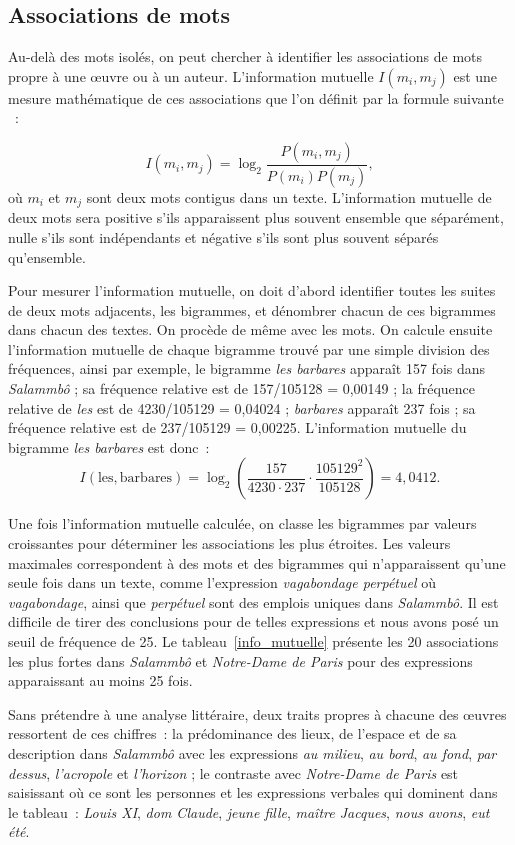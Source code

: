 \documentclass[]{article}
\begin{document}
\subsection{Associations de mots}
Au-delà des mots isolés, on peut chercher à identifier les associations de mots propre à une œuvre ou à un auteur. L'information mutuelle $I(m_i ,m_j )$ est une mesure mathématique de ces associations que l'on définit par la formule suivante \citep{Fano1961}~:

\[
I(m_i ,m_j ) = \log_2 \frac{P(m_i ,m_j )}{P(m_i )P(m_j )},
\]
où $m_i$ et $m_j$ sont deux mots contigus dans un texte. L'information mutuelle de deux mots sera positive s'ils apparaissent plus souvent ensemble que séparément, nulle s'ils sont indépendants et négative s'ils sont plus souvent séparés qu'ensemble.

Pour mesurer l'information mutuelle, on doit d'abord identifier toutes les suites de deux mots adjacents, les bigrammes, et dénombrer chacun de ces bigrammes dans chacun des textes. On procède de même avec les mots.  On calcule ensuite l'information mutuelle de chaque bigramme trouvé par une simple division des fréquences, ainsi par exemple, le bigramme \textit{les barbares} apparaît 157 fois dans \textit{Salammbô} ; sa fréquence relative est de 157/105128 = 0,00149 ; la fréquence relative de \textit{les} est de 4230/105129 = 0,04024 ; \textit{barbares} apparaît 237 fois ; sa fréquence relative est de 237/105129 = 0,00225. L'information mutuelle du bigramme \textit{les barbares} est donc~:
\[
I(\textrm{les}, \textrm{barbares}) = \log_2 (\frac{157}{4230 \cdot 237} \cdot \frac{105129^2}{105128}) = 4,0412.
\]

Une fois l'information mutuelle calculée, on classe les bigrammes par valeurs croissantes pour déterminer les associations les plus étroites. Les valeurs maximales correspondent à des mots et des bigrammes qui n'apparaissent qu'une seule fois dans un texte, comme l'expression \textit{vagabondage perpétuel} où \textit{vagabondage}, ainsi que \textit{perpétuel} sont des emplois uniques dans \textit{Salammbô}. Il est difficile de tirer des conclusions pour de telles expressions et nous avons posé un seuil de fréquence de 25. Le tableau~\ref{info_mutuelle} présente les 20 associations les plus fortes dans \textit{Salammbô} et \textit{Notre-Dame de Paris} pour des expressions apparaissant au moins 25 fois.

Sans prétendre à une analyse littéraire, deux traits propres à chacune des œuvres ressortent de ces chiffres~: la prédominance des lieux, de l'espace et de sa description dans \textit{Salammbô} avec les expressions \textit{au milieu}, \textit{au bord}, \textit{au fond}, \textit{par dessus}, \textit{l'acropole} et \textit{l'horizon} ; le contraste avec \textit{Notre-Dame de Paris} est saisissant où ce sont les personnes et les expressions verbales qui dominent dans le tableau~: \textit{Louis XI}, \textit{dom Claude}, \textit{jeune fille}, \textit{maître Jacques}, \textit{nous avons}, \textit{eut été}.
\end{document}
